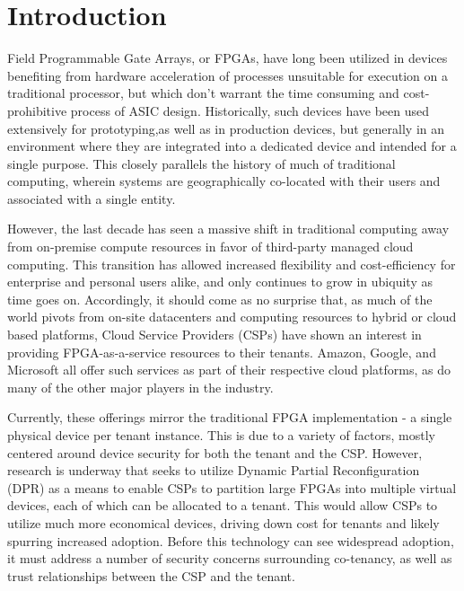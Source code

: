 
\chapter{Introduction}\label{ch:introduction}

Field Programmable Gate Arrays, or FPGAs, have long been utilized in devices benefiting from hardware acceleration of processes unsuitable for execution on a traditional processor, but which don't warrant the time consuming and cost-prohibitive process of ASIC design. Historically, such devices have been used extensively for prototyping,as well as in production devices, but generally in an environment where they are integrated into a dedicated device and intended for a single purpose. This closely parallels the history of much of traditional computing, wherein systems are geographically co-located with their users and associated with a single entity. 

However, the last decade has seen a massive shift in traditional computing away from on-premise compute resources in favor of third-party managed cloud computing. This transition has allowed increased flexibility and cost-efficiency for enterprise and personal users alike, and only continues to grow in ubiquity as time goes on. Accordingly, it should come as no surprise that, as much of the world pivots from on-site datacenters and computing resources to hybrid or cloud based platforms, Cloud Service Providers (CSPs) have shown an interest in providing FPGA-as-a-service resources to their tenants. Amazon, Google, and Microsoft all offer such services as part of their respective cloud platforms, as do many of the other major players in the industry. 

Currently, these offerings mirror the traditional FPGA implementation - a single physical device per tenant instance. This is due to a variety of factors, mostly centered around device security for both the tenant and the CSP. However, research is underway that seeks to utilize Dynamic Partial Reconfiguration (DPR) as a means to enable CSPs to partition large FPGAs into multiple virtual devices, each of which can be allocated to a tenant. This would allow CSPs to utilize much more economical devices, driving down cost for tenants and likely spurring increased adoption. Before this technology can see widespread adoption, it must address a number of security concerns surrounding co-tenancy, as well as trust relationships between the CSP and the tenant.

